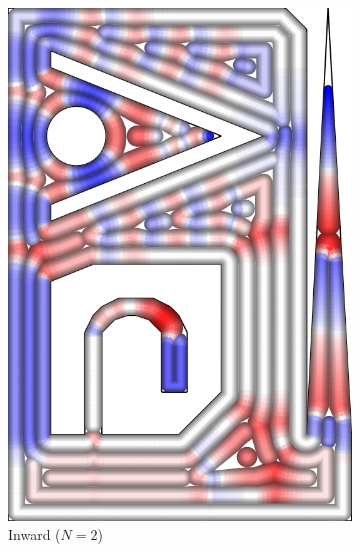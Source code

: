 \begin{figure}
\begin{subfigure}{\figwidth}
\includegraphics[height=\figheight]{sources-validation-gMAT-example-TEST-InwardDistributed-widths.png}
\caption{Inward {($N=2$)}}\label{TEST_InwardDistributed_accuracy}
\end{subfigure}
\begin{subfigure}{.04\columnwidth}\centering
\vspace{4.7cm}

\end{subfigure}
\end{figure}
